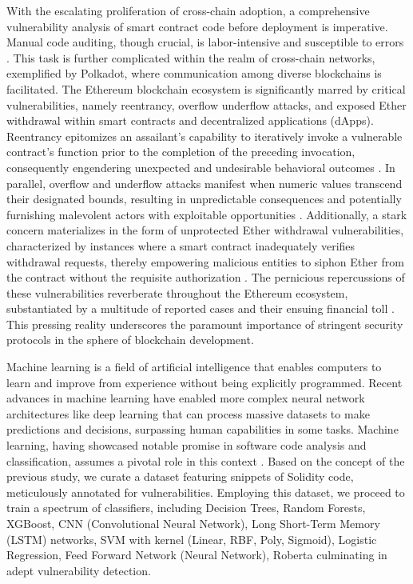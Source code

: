 \documentclass[sigconf]{acmart}
\begin{document}
With the escalating proliferation of cross-chain adoption, a comprehensive vulnerability analysis of smart contract code before deployment is imperative. Manual code auditing, though crucial, is labor-intensive and susceptible to errors \cite{huang2018hunting}. This task is further complicated within the realm of cross-chain networks, exemplified by Polkadot, where communication among diverse blockchains is facilitated. The Ethereum blockchain ecosystem is significantly marred by critical vulnerabilities, namely reentrancy, overflow underflow attacks, and exposed Ether withdrawal within smart contracts and decentralized applications (dApps). Reentrancy epitomizes an assailant's capability to iteratively invoke a vulnerable contract's function prior to the completion of the preceding invocation, consequently engendering unexpected and undesirable behavioral outcomes \cite{rodler2018sereum}. In parallel, overflow and underflow attacks manifest when numeric values transcend their designated bounds, resulting in unpredictable consequences and potentially furnishing malevolent actors with exploitable opportunities \cite{praitheeshan2019security}. Additionally, a stark concern materializes in the form of unprotected Ether withdrawal vulnerabilities, characterized by instances where a smart contract inadequately verifies withdrawal requests, thereby empowering malicious entities to siphon Ether from the contract without the requisite authorization \cite{kushwaha2022systematic}. The pernicious repercussions of these vulnerabilities reverberate throughout the Ethereum ecosystem, substantiated by a multitude of reported cases and their ensuing financial toll \cite{sayeed2020smart}. This pressing reality underscores the paramount importance of stringent security protocols in the sphere of blockchain development.

Machine learning is a field of artificial intelligence that enables computers to learn and improve from experience without being explicitly programmed. Recent advances in machine learning have enabled more complex neural network architectures like deep learning that can process massive datasets to make predictions and decisions, surpassing human capabilities in some tasks. Machine learning, having showcased notable promise in software code analysis and classification, assumes a pivotal role in this context \cite{liao2019soliaudit}. Based on the concept of the previous study, we curate a dataset featuring snippets of Solidity code, meticulously annotated for vulnerabilities. Employing this dataset, we proceed to train a spectrum of classifiers, including Decision Trees, Random Forests, XGBoost, CNN (Convolutional Neural Network), Long Short-Term Memory (LSTM) networks, SVM with kernel (Linear, RBF, Poly, Sigmoid), Logistic Regression, Feed Forward Network (Neural Network), Roberta culminating in adept vulnerability detection.
\end{document}
